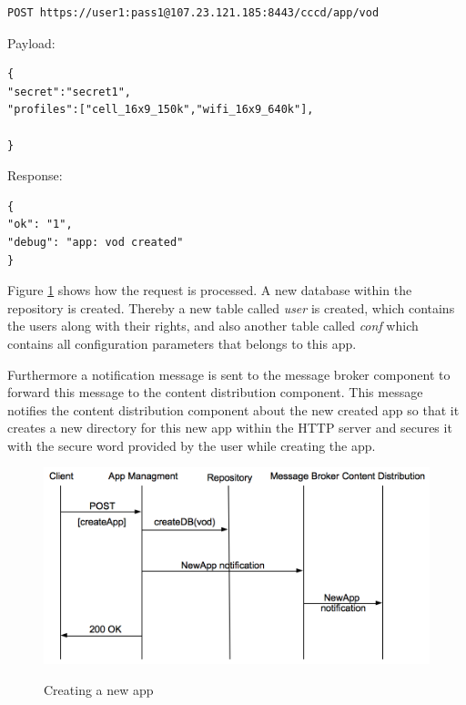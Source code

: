 \begin{code}
\begin{verbatim}
POST https://user1:pass1@107.23.121.185:8443/cccd/app/vod
\end{verbatim}
Payload:
\begin{verbatim}
{
"secret":"secret1",
"profiles":["cell_16x9_150k","wifi_16x9_640k"],

}
\end{verbatim}
Response:
\begin{verbatim}
{
"ok": "1",
"debug": "app: vod created"
}
\end{verbatim}
\end{code}
 
Figure \ref{fig:newApp} shows how the request is processed. A new database within the repository is created. Thereby a new table called \textit{user} is created, which contains the users along with their rights, and also another table called \textit{conf} which contains all configuration parameters that belongs to this app.

Furthermore a notification message is sent to the message broker component to forward this message to the content distribution component. This message notifies the content distribution component about the new created app so that it creates a new directory for this new app within the HTTP server and secures it with the secure word provided by the user while creating the app.

\begin{figure}[htb]
  \centering
  \includegraphics[scale=0.6]{flows/newAppFlow.png}\\
  \caption{Creating a new app}
  \label{fig:newApp}
\end{figure}

